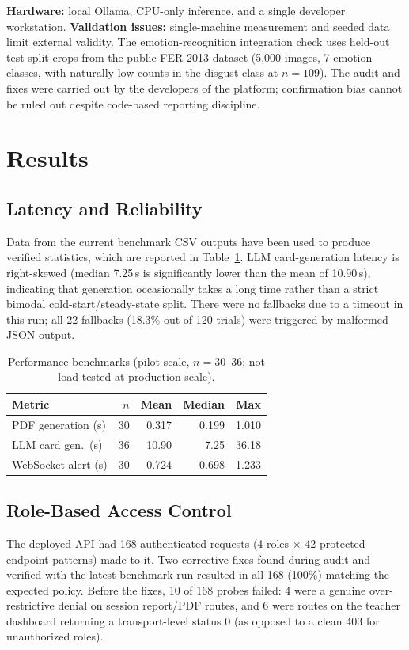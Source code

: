 \documentclass[conference]{IEEEtran}
\begin{document}
\textbf{Hardware:} local Ollama, CPU-only inference, and a single developer workstation. \textbf{Validation issues:} single-machine measurement and seeded data limit external validity. The emotion-recognition integration check uses held-out test-split crops from the public FER-2013 dataset (5{,}000 images, 7 emotion classes, with naturally low counts in the disgust class at $n{=}109$). The audit and fixes were carried out by the developers of the platform; confirmation bias cannot be ruled out despite code-based reporting discipline.

\section{Results}
\subsection{Latency and Reliability}
Data from the current benchmark CSV outputs have been used to produce verified statistics, which are reported in Table~\ref{tab:VII}. LLM card-generation latency is right-skewed (median 7.25\,s is significantly lower than the mean of 10.90\,s), indicating that generation occasionally takes a long time rather than a strict bimodal cold-start/steady-state split. There were no fallbacks due to a timeout in this run; all 22 fallbacks (18.3\% out of 120 trials) were triggered by malformed JSON output.

\begin{table}[!t]
\caption{Performance benchmarks (pilot-scale, $n{=}30$--36; not load-tested at production scale).}
\label{tab:VII}
\centering
\small
\begin{tabular}{@{}lrrrr@{}}
\toprule
\textbf{Metric} & \textbf{$n$} & \textbf{Mean} & \textbf{Median} & \textbf{Max} \\
\midrule
PDF generation (s) & 30 & 0.317 & 0.199 & 1.010 \\
LLM card gen.\ (s) & 36 & 10.90 & 7.25 & 36.18 \\
WebSocket alert (s) & 30 & 0.724 & 0.698 & 1.233 \\
\bottomrule
\end{tabular}
\end{table}

\subsection{Role-Based Access Control}
\label{sec:rbac}
The deployed API had 168 authenticated requests (4 roles $\times$ 42 protected endpoint patterns) made to it. Two corrective fixes found during audit and verified with the latest benchmark run resulted in all 168 (100\%) matching the expected policy. Before the fixes, 10 of 168 probes failed: 4 were a genuine over-restrictive denial on session report/PDF routes, and 6 were routes on the teacher dashboard returning a transport-level status 0 (as opposed to a clean 403 for unauthorized roles).
\end{document}
